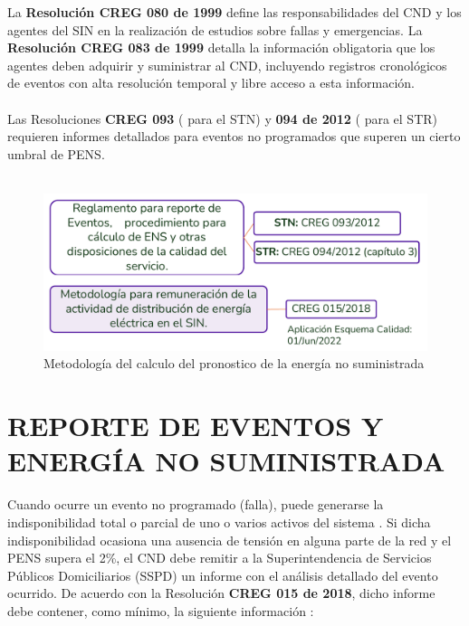 \documentclass[a5paper]{book}%
\begin{document}
La \textbf{Resolución CREG 080 de 1999} define las responsabilidades del CND y los agentes del SIN en la realización de estudios sobre fallas y emergencias. La \textbf{Resolución CREG 083 de 1999} detalla la información obligatoria que los agentes deben adquirir y suministrar al CND, incluyendo registros cronológicos de eventos con alta resolución temporal y libre acceso a esta información.\\\\ 

Las Resoluciones \textbf{CREG 093} ( para el \ac{STN}) y \textbf{094 de 2012} ( para el STR) requieren informes detallados para eventos no programados que superen un cierto umbral de \ac{PENS}.\\\\

\begin{figure}[H]
	\centering
	\caption{Metodología del calculo del pronostico de la energía no suministrada}
	\label{fig:ens}
	\includegraphics[width=\linewidth]{calculo_ens.png}
\end{figure}

\section{REPORTE DE EVENTOS Y ENERGÍA NO SUMINISTRADA}

Cuando ocurre un evento no programado (falla), puede generarse la indisponibilidad total o parcial de uno o varios activos del sistema \cite{CREG0942012}.  
Si dicha indisponibilidad ocasiona una ausencia de tensión en alguna parte de la red y el \ac{PENS} supera el 2\%, el \ac{CND} debe remitir a la Superintendencia de Servicios Públicos Domiciliarios (SSPD) un informe con el análisis detallado del evento ocurrido. De acuerdo con la Resolución \textbf{CREG 015 de 2018}, dicho informe debe contener, como mínimo, la siguiente información \cite{CREG0152018}:
\end{document}
